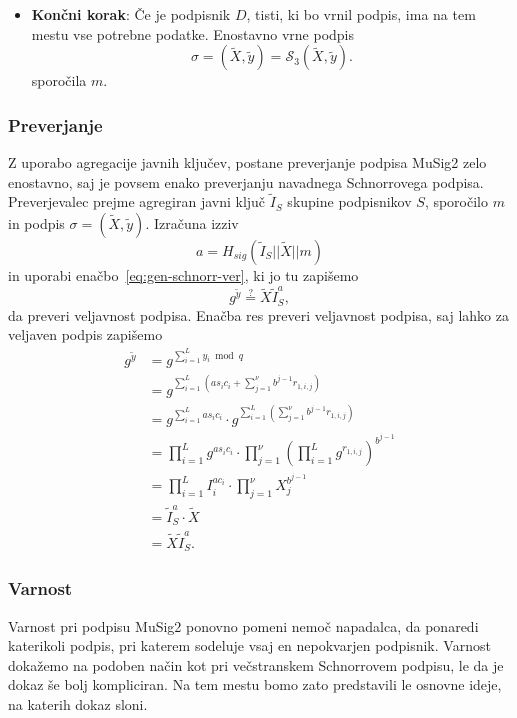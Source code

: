 \begin{itemize}
    \item \textbf{Končni korak}:
        Če je podpisnik $D$, tisti, ki bo vrnil podpis, ima na tem mestu vse potrebne podatke.
        Enostavno vrne podpis
        $$
        \sigma = (\tilde{X}, \tilde{y}) = \mathcal{S}_3(\tilde{X}, \tilde{y}).
        $$
        sporočila $m$.
\end{itemize}

\subsubsection{Preverjanje}
Z uporabo agregacije javnih ključev, postane preverjanje podpisa MuSig2 zelo enostavno, saj je
povsem enako preverjanju navadnega Schnorrovega podpisa. Preverjevalec prejme agregiran javni ključ
$\tilde{I}_S$ skupine podpisnikov $S$, sporočilo $m$ in podpis $\sigma = (\tilde{X}, \tilde{y})$.
Izračuna izziv
$$
a = H_{sig}(\tilde{I}_S || \tilde{X} || m)
$$ in uporabi enačbo~\eqref{eq:gen-schnorr-ver}, ki jo tu zapišemo
$$
g^{\tilde{y}} \stackrel{?}{=} \tilde{X} \tilde{I}_S^a,
$$
da preveri veljavnost podpisa. Enačba res preveri veljavnost podpisa, saj lahko za veljaven podpis
zapišemo
\begin{align*}
    g^{\tilde{y}} &= g^{\sum_{i=1}^L y_i \bmod q} \\
    &= g^{\sum_{i=1}^L (a s_i c_i + \sum_{j=1}^\nu b^{j-1} r_{1, i, j})} \\
    &= g^{\sum_{i=1}^L a s_i c_i} \cdot g^{\sum_{i=1}^L(\sum_{j=1}^\nu b^{j-1} r_{1, i, j})} \\
    &= \prod_{i=1}^L g^{a s_i c_i} \cdot \prod_{j=1}^\nu (\prod_{i=1}^L g^{r_{1, i, j}})^{b^{j-1}} \\
    &= \prod_{i=1}^L I_i^{a c_i} \cdot \prod_{j=1}^\nu X_j^{b^{j-1}} \\
    &= \tilde{I}_S^a \cdot \tilde{X} \\
    &= \tilde{X} \tilde{I}_S^a.
\end{align*}

\subsubsection{Varnost}
Varnost pri podpisu MuSig2 ponovno pomeni nemoč napadalca, da ponaredi katerikoli podpis, pri katerem
sodeluje vsaj en nepokvarjen podpisnik. Varnost dokažemo na podoben način kot pri večstranskem Schnorrovem
podpisu, le da je dokaz še bolj kompliciran. Na tem mestu bomo zato predstavili le osnovne ideje,
na katerih dokaz sloni.

